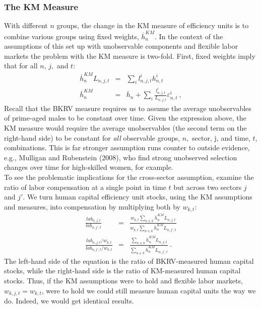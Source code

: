 \documentclass[10pt]{article}
\begin{document}
\subsubsection{The KM Measure}
With different $n$ groups, the change in the KM measure of efficiency units is to combine various groups using fixed weights, $\overline{h}_{n}^{KM}$. In the context of the assumptions of this set up with unobservable components and flexible labor markets the problem with the KM measure is two-fold. First, fixed weights imply that for all $n$, $j,$ and $t$:
\begin{eqnarray*}
\overline{h}_{n}^{KM}L_{n,j,t} & = & \sum_{i}l_{n,j,t}^{i}h_{n,t}^{i}\\
\overline{h}_{n}^{KM} & = & \overline{h}_{n}+\sum_{i}\frac{l_{n,j,t}^{i}}{L_{n,j,t}}\varepsilon_{n,t}^{i} \ ,
\end{eqnarray*}
Recall that the BKRV measure requires us to assume the average unobservables of prime-aged males to be constant over time. Given the expression above, the KM measure would require the average unobservables (the second term on the right-hand side) to be constant for \textit{all} observable groups, $n,$ sector, j, and time, $t$, combinations. This is far stronger assumption runs counter to outside evidence, e.g., Mulligan and Rubenstein (2008), who find strong unobserved selection changes over time for high-skilled women, for example.\\ 

To see the problematic implications for the cross-sector assumption, examine the ratio of labor compensation at a single point in time $t$ but across two sectors $j$ and $j'$. We turn human capital efficiency unit stocks, using the KM assumptions and measures, into compensation by multiplying both by $w_{k,t}$:
\begin{eqnarray*}
\frac{lab_{n,j,t}}{lab_{n,j',t}} & = & \frac{w_{k,t}\sum_{n\in k}\overline{h}_{n}^{KM}L_{n,j,t}}{w_{k,t}\sum_{n\in k}\overline{h}_{n}^{KM}L_{n,j',t}}\\
\frac{lab_{n,j,t}/w_{k,t}}{lab_{n,j',t}/w_{k,t}} & = & \frac{\sum_{n\in k}\overline{h}_{n}^{KM}L_{n,j,t}}{\sum_{n\in k}\overline{h}_{n}^{KM}L_{n,j',t}} \ .
\end{eqnarray*}
The left-hand side of the equation is the ratio of BKRV-measured human capital stocks, while the right-hand side is the ratio of KM-measured human capital stocks. Thus, if the KM assumptions were to hold and flexible labor markets, $w_{k,j,t}=w_{k,t}$, were to hold we could still measure human capital units the way we do. Indeed, we would get identical results.\\ 
\end{document}

